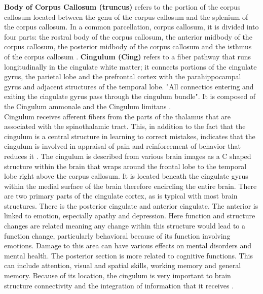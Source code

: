 \documentclass[../structure.tex]{subfiles}
\begin{document}
\textbf{Body of Corpus Callosum (truncus)} 
		 refers to the portion of the corpus callosum located between the genu of the corpus callosum and the splenium of the corpus callosum. In a common parcellation, corpus callosum, it is divided into four parts: the rostral body of the corpus callosum, the anterior midbody of the corpus callosum, the posterior midbody of the corpus callosum and the isthmus of the corpus callosum \cite{Washington1994}.
		\textbf{Cingulum (Cing)}
		refers to a fiber pathway that runs longitudinally in the cingulate white matter; it connects portions of the cingulate gyrus, the parietal lobe and the prefrontal cortex with the parahippocampal gyrus and adjacent structures of the temporal lobe. "All connectios entering and exiting the cingulate gyrus pass through the cingulum bundle". It is composed of the Cingulum ammonale and the Cingulum limitans \cite{Washington1994}.\\
Cingulum receives afferent fibers from the parts of the thalamus that are associated with the spinothalamic tract. This, in addition to the fact that the cingulum is a central structure in learning to correct mistakes, indicates that the cingulum is involved in appraisal of pain and reinforcement of behavior that reduces it \cite{Brodal2016}.
The cingulum is described from various brain images as a C shaped structure within the brain that wraps around the frontal lobe to the temporal lobe right above the corpus callosum. It is located beneath the cingulate gyrus within the medial surface of the brain therefore encircling the entire brain. There are two primary parts of the cingulate cortex, as is typical with most brain structures. There is the posterior cingulate and anterior cingulate. The anterior is linked to emotion, especially apathy and depression. Here function and structure changes are related meaning any change within this structure would lead to a function change, particularly behavioral because of its function involving emotions. Damage to this area can have various effects on mental disorders and mental health. The posterior section is more related to cognitive functions. This can include attention, visual and spatial skills, working memory and general memory. Because of its location, the cingulum is very important to brain structure connectivity and the integration of information that it receives \cite{JaredTanner2010}.
	
\end{document}
